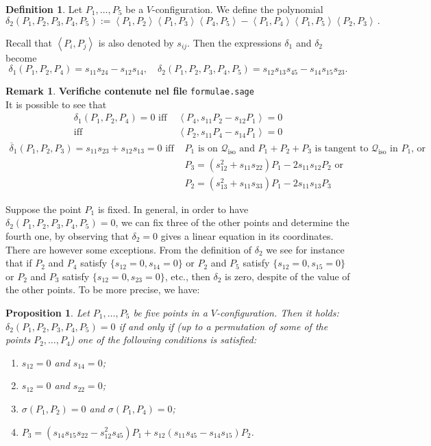 \documentclass{amsart}
\theoremstyle{plain}
\newtheorem{prop}[lemma]{Proposition}
\theoremstyle{definition}
\newtheorem{definition}[lemma]{Definition}
\newtheorem{rmk}[lemma]{Remark}
\newcommand{\iso}{\mathcal{Q}_{\mathrm{iso}}}
\newcommand{\scl}[2]{\left\langle {#1}, {#2} \right\rangle}
\begin{document}
\begin{definition}
 Let $P_1, \dots, P_5$ be a $V$-configuration.
We define the polynomial
 \[
  \delta_2(P_1, P_2, P_3, P_4, P_5) :=
  \scl{P_1}{P_2} \scl{P_1}{P_3} \scl{P_4}{P_5} -
  \scl{P_1}{P_4} \scl{P_1}{P_5} \scl{P_2}{P_3} \,.
 \]
\end{definition}
Recall that $\scl{P_i}{P_j}$ is also denoted by $s_{ij}$.
Then the expressions $\delta_1$ and $\delta_2$ become
\[
\delta_1(P_1, P_2, P_4) = s_{11} s_{24}-s_{12}s_{14},
\quad \delta_2(P_1, P_2, P_3, P_4, P_5) =s_{12}s_{13}s_{45}-s_{14}s_{15} s_{23}.
\]
%
\begin{rmk}
\label{rmk:characteristics_d1_d2}
\textbf{Verifiche contenute nel file} \verb+formulae.sage+ \\
It is possible to see that
%
\begin{align}
\label{rmk_delta_case1}
\delta_1(P_1, P_2, P_4) = 0  \mbox{ iff } &\scl{P_4}{s_{11}P_2-s_{12}P_1} = 0\\
 \mbox{iff } &\scl{P_2}{s_{11}P_4-s_{14}P_1} = 0 \nonumber
\end{align}
\begin{align}
\label{rmk_delta_case2}
\overline{\delta}_1(P_1, P_2, P_3) = s_{11} s_{23}+s_{12}s_{13} =0 \mbox{ iff } &
P_1 \mbox{ is on~$\iso$ and } P_1 + P_2 + P_3 \mbox{ is tangent to~$\iso$ in $P_1$, or} \\
& P_3 = (s_{12}^2+s_{11}s_{22})P_1-2s_{11}s_{12}P_2 \mbox{ or} \nonumber \\
& P_2 = (s_{13}^2+s_{11}s_{33})P_1-2s_{11}s_{13}P_3 \nonumber
\end{align}

\end{rmk}
Suppose the point $P_1$ is fixed. In general, in order to have
$\delta_2(P_1, P_2, P_3, P_4, P_5) = 0$, we can fix three of the other points
and determine the fourth one, by observing
that $\delta_2=0$ gives a linear equation in its coordinates. There are
however
some exceptions. From the definition of $\delta_2$ we see for instance that
if $P_2$ and $P_4$ satisfy $\{s_{12}=0, s_{14}=0\}$ or $P_2$ and
$P_5$ satisfy $\{s_{12}=0, s_{15}=0\}$ or $P_2$ and $P_3$ satisfy
$\{s_{12}=0, s_{23}=0\}$, etc., then $\delta_2$ is zero,
despite of the value of the other points. To be more precise, we have:
%
\begin{prop}
\label{prop:definitionP3}
Let $P_1, \dots, P_5$ be five points in a $V$-configuration. Then it holds:
$\delta_2(P_1, P_2, P_3, P_4, P_5) = 0$ if and only if (up to a permutation
of some of the points $P_2, \dots, P_4$) one of the following conditions
is satisfied:
\begin{enumerate}
\item $s_{12} = 0$ and $s_{14} = 0$;
\label{defP3_1}
\item $s_{12} = 0$ and $s_{22} = 0$;
\label{defP3_2}
\item $\sigma(P_1, P_2) = 0$ and $\sigma(P_1, P_4) = 0$;
\label{defP3_3}
\item $P_3 = (s_{14}s_{15}s_{22}-s_{12}^2s_{45})P_1   +s_{12}(s_{11}s_{45}-s_{14}s_{15})P_2$.
\label{defP3_4}
\end{enumerate}
\end{prop}
\end{document}
